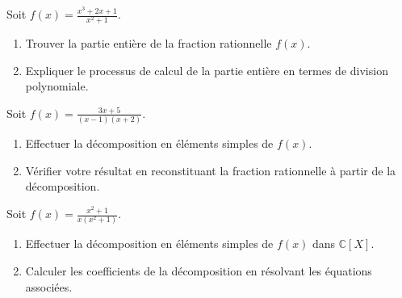 \begin{exercice}
Soit \( f(x) = \frac{x^3 + 2x + 1}{x^2 + 1} \).
\begin{enumerate}
    \item Trouver la partie entière de la fraction rationnelle \( f(x) \).
    \item Expliquer le processus de calcul de la partie entière en termes de division polynomiale.
\end{enumerate}
\end{exercice}

\begin{exercice}
Soit \( f(x) = \frac{3x+5}{(x-1)(x+2)} \).
\begin{enumerate}
    \item Effectuer la décomposition en éléments simples de \( f(x) \).
    \item Vérifier votre résultat en reconstituant la fraction rationnelle à partir de la décomposition.
\end{enumerate}
\end{exercice}

\begin{exercice}
Soit \( f(x) = \frac{x^2 + 1}{x(x^2 + 1)} \).
\begin{enumerate}
    \item Effectuer la décomposition en éléments simples de \( f(x) \) dans \( \mathbb{C}[X] \).
    \item Calculer les coefficients de la décomposition en résolvant les équations associées.
\end{enumerate}
\end{exercice}

